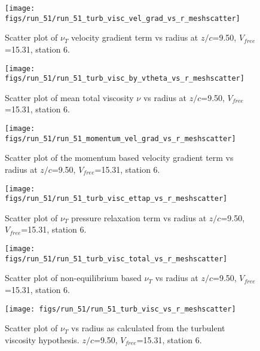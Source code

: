 \begin{figure}[H]
\centering
\texttt{[image: figs/run\_51/run\_51\_turb\_visc\_vel\_grad\_vs\_r\_meshscatter]}
\caption{Scatter plot of $\nu_T$ velocity gradient term vs radius at $z/c$=9.50, $V_{free}$=15.31, station 6.}
\end{figure}


\begin{figure}[H]
\centering
\texttt{[image: figs/run\_51/run\_51\_turb\_visc\_by\_vtheta\_vs\_r\_meshscatter]}
\caption{Scatter plot of mean total viscosity $\nu$ vs radius at $z/c$=9.50, $V_{free}$=15.31, station 6.}
\end{figure}


\begin{figure}[H]
\centering
\texttt{[image: figs/run\_51/run\_51\_momentum\_vel\_grad\_vs\_r\_meshscatter]}
\caption{Scatter plot of the momentum based velocity gradient term vs radius at $z/c$=9.50, $V_{free}$=15.31, station 6.}
\end{figure}


\begin{figure}[H]
\centering
\texttt{[image: figs/run\_51/run\_51\_turb\_visc\_ettap\_vs\_r\_meshscatter]}
\caption{Scatter plot of $\nu_T$ pressure relaxation term vs radius at $z/c$=9.50, $V_{free}$=15.31, station 6.}
\end{figure}


\begin{figure}[H]
\centering
\texttt{[image: figs/run\_51/run\_51\_turb\_visc\_total\_vs\_r\_meshscatter]}
\caption{Scatter plot of non-equilibrium based $\nu_T$ vs radius at $z/c$=9.50, $V_{free}$=15.31, station 6.}
\end{figure}


\begin{figure}[H]
\centering
\texttt{[image: figs/run\_51/run\_51\_turb\_visc\_vs\_r\_meshscatter]}
\caption{Scatter plot of $\nu_T$ vs radius as calculated from the turbulent viscosity hypothesis. $z/c$=9.50, $V_{free}$=15.31, station 6.}
\end{figure}


